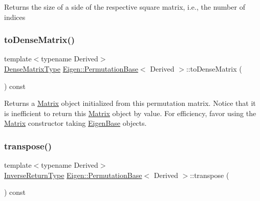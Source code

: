 \begin{DoxyReturn}{Returns}
the size of a side of the respective square matrix, i.\+e., the number of indices 
\end{DoxyReturn}
\mbox{\label{class_eigen_1_1_permutation_base_addfa91a2c2c69c76159f1091368a505f}} 
\subsubsection{\texorpdfstring{toDenseMatrix()}{toDenseMatrix()}}
{\footnotesize\ttfamily template$<$typename Derived$>$ \\
\mbox{\hyperlink{class_eigen_1_1_matrix}{Dense\+Matrix\+Type}} \mbox{\hyperlink{class_eigen_1_1_permutation_base}{Eigen\+::\+Permutation\+Base}}$<$ Derived $>$\+::to\+Dense\+Matrix (\begin{DoxyParamCaption}{ }\end{DoxyParamCaption}) const\hspace{0.3cm}{\ttfamily [inline]}}

\begin{DoxyReturn}{Returns}
a \mbox{\hyperlink{class_eigen_1_1_matrix}{Matrix}} object initialized from this permutation matrix. Notice that it is inefficient to return this \mbox{\hyperlink{class_eigen_1_1_matrix}{Matrix}} object by value. For efficiency, favor using the \mbox{\hyperlink{class_eigen_1_1_matrix}{Matrix}} constructor taking \mbox{\hyperlink{struct_eigen_1_1_eigen_base}{Eigen\+Base}} objects. 
\end{DoxyReturn}
\mbox{\label{class_eigen_1_1_permutation_base_a05805e9f4182eec3f6632e1c765b5ffe}} 
\subsubsection{\texorpdfstring{transpose()}{transpose()}}
{\footnotesize\ttfamily template$<$typename Derived$>$ \\
\mbox{\hyperlink{class_eigen_1_1_inverse}{Inverse\+Return\+Type}} \mbox{\hyperlink{class_eigen_1_1_permutation_base}{Eigen\+::\+Permutation\+Base}}$<$ Derived $>$\+::transpose (\begin{DoxyParamCaption}{ }\end{DoxyParamCaption}) const\hspace{0.3cm}{\ttfamily [inline]}}

